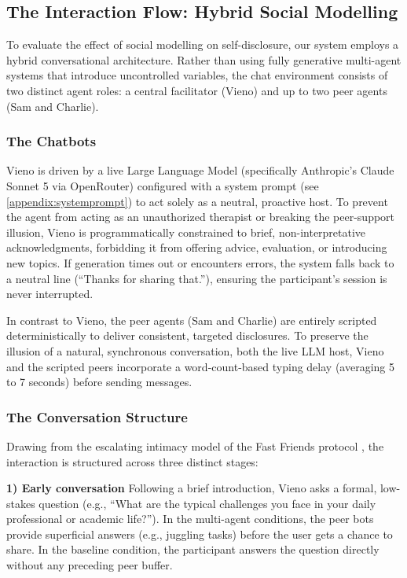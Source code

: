 \documentclass[sigconf]{acmart}
\begin{document}
\subsection{The Interaction Flow: Hybrid Social Modelling}

To evaluate the effect of social modelling on self-disclosure, our system employs a hybrid conversational architecture. Rather than using fully generative multi-agent systems that introduce uncontrolled variables, the chat environment consists of two distinct agent roles: a central facilitator (Vieno) and up to two peer agents (Sam and Charlie).

\subsubsection{The Chatbots}

Vieno is driven by a live Large Language Model (specifically Anthropic's Claude Sonnet 5 via OpenRouter) configured with a system prompt (see \autoref{appendix:systemprompt}) to act solely as a neutral, proactive host. To prevent the agent from acting as an unauthorized therapist or breaking the peer-support illusion, Vieno is programmatically constrained to brief, non-interpretative acknowledgments, forbidding it from offering advice, evaluation, or introducing new topics. If generation times out or encounters errors, the system falls back to a neutral line (``Thanks for sharing that.''), ensuring the participant's session is never interrupted.

In contrast to Vieno, the peer agents (Sam and Charlie) are entirely scripted deterministically to deliver consistent, targeted disclosures. To preserve the illusion of a natural, synchronous conversation, both the live LLM host, Vieno and the scripted peers incorporate a word-count-based typing delay (averaging 5 to 7 seconds) before sending messages.

\subsubsection{The Conversation Structure}
\label{subsubsection:conv_structure}

Drawing from the escalating intimacy model of the Fast Friends protocol \cite{Aron1997FastFriends}, the interaction is structured across three distinct stages:

\textbf{1) Early conversation} Following a brief introduction, Vieno asks a formal, low-stakes question (e.g., ``What are the typical challenges you face in your daily professional or academic life?''). In the multi-agent conditions, the peer bots provide superficial answers (e.g., juggling tasks) before the user gets a chance to share. In the baseline condition, the participant answers the question directly without any preceding peer buffer.
\end{document}
